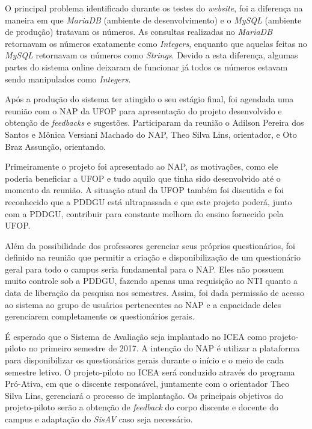 \documentclass[
  12pt,       %
  openright,      %
  oneside,      %
  a4paper,      %
  english,      %
  french,        %
  spanish,     %
  brazil        %
  ]{abntex2-decsi}
\begin{document}
            O principal problema identificado durante os testes do \textit{website}, foi a diferença na maneira em que \textit{MariaDB} (ambiente de desenvolvimento) e o \textit{MySQL} (ambiente de produção) tratavam os números. As consultas realizadas no \textit{MariaDB} retornavam os números exatamente como \textit{Integers}, enquanto que aquelas feitas no \textit{MySQL} retornavam os números como \textit{Strings}. Devido a esta diferença, algumas partes do sistema online deixaram de funcionar já todos os números estavam sendo manipulados como \textit{Integers}.
                               

	Após a produção do sistema ter atingido o seu estágio final, foi agendada uma reunião com o NAP da UFOP para apresentação do projeto desenvolvido e obtenção de \textit{feedbacks} e sugestões. Participaram da reunião o Adilson Pereira dos Santos e Mônica Versiani Machado do NAP, Theo Silva Lins, orientador, e Oto Braz Assunção, orientando. 
    
    Primeiramente o projeto foi apresentado ao NAP, as motivações, como ele poderia beneficiar a UFOP e tudo aquilo que tinha sido desenvolvido até o momento da reunião. A situação atual da UFOP também foi discutida e foi reconhecido que a PDDGU está ultrapassada e que este projeto poderá, junto com a PDDGU, contribuir para constante melhora do ensino fornecido pela UFOP.
    
    Além da possibilidade dos professores gerenciar seus próprios questionários, foi definido na reunião que permitir a criação e disponibilização de um questionário geral para todo o campus seria fundamental para o NAP. Eles não possuem muito controle sob a PDDGU, fazendo apenas uma requisição ao NTI quanto a data de liberação da pesquisa nos semestres. Assim, foi dada permissão de acesso ao sistema ao grupo de usuários pertencentes ao NAP e a capacidade deles gerenciarem completamente os questionários gerais. 
    
    É esperado que o Sistema de Avaliação seja implantado no ICEA como projeto-piloto no primeiro semestre de 2017. A intenção do NAP é utilizar a plataforma para disponibilizar os questionários gerais durante o início e o meio de cada semestre letivo. O projeto-piloto no ICEA será conduzido através do programa Pró-Ativa, em que o discente responsável, juntamente com o orientador Theo Silva Lins, gerenciará o processo de implantação. Os principais objetivos do projeto-piloto serão a obtenção de \textit{feedback} do corpo discente e docente do campus e adaptação do \textit{SisAV} caso seja necessário. 
    
\end{document}
